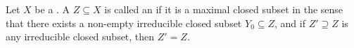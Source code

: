 \begin{definition} \label{definition:irreducible_component_of_a_topological_space}
Let $X$ be a . A  $Z \subseteq X$ is called an  if it is a maximal  closed subset in the sense that there exists a non-empty irreducible closed subset $Y_0 \subseteq Z$, and if $Z' \supseteq Z$ is any irreducible closed subset, then $Z' = Z$.

\end{definition}
